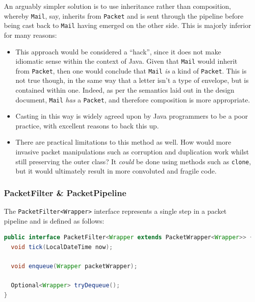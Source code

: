An arguably simpler solution is to use inheritance rather than composition, whereby \texttt{Mail}, say, inherits from
\texttt{Packet} and is sent through the pipeline before being cast back to \texttt{Mail} having emerged on the other
side. This is majorly inferior for many reasons:
\begin{itemize}
    \item This approach would be considered a ``hack'', since it does not make idiomatic sense within the context of
    Java. Given that \texttt{Mail} would inherit from \texttt{Packet}, then one would conclude that \texttt{Mail}
    \emph{is} a kind of \texttt{Packet}. This is not true though, in the same way that a letter isn't a type of
    envelope, but is contained within one. Indeed, as per the semantics laid out in the design document,
    \texttt{Mail} \emph{has} a \texttt{Packet}, and therefore composition is more appropriate.
    \item Casting in this way is widely agreed upon by Java programmers to be a poor practice, with excellent reasons
    to back this up\cite{reddit_casting, yegor_bugayenko_casting, mark_casting, dennis_sosnoski_casting,
        erik_dietrich_casting}.
    \item There are practical limitations to this method as well. How would more invasive packet manipulations such
    as corruption and duplication work whilst still preserving the outer class? It \emph{could} be done using
    methods such as \texttt{clone}\cite{java_clone}, but it would ultimately result in more convoluted and fragile
    code\cite{java_avoid_clone}.
\end{itemize}

\subsubsection{PacketFilter \& PacketPipeline}

The \texttt{PacketFilter<Wrapper>} interface represents a single step in a packet pipeline and is defined as follows:
\begin{lstlisting}[language=Java,caption={The \texttt{PacketFilter<Wrapper>} interface exactly as it appears in the
codebase.},label={code:packet_filter_interface},captionpos=b]
public interface PacketFilter<Wrapper extends PacketWrapper<Wrapper>> {
  void tick(LocalDateTime now);

  void enqueue(Wrapper packetWrapper);

  Optional<Wrapper> tryDequeue();
}
\end{lstlisting}

